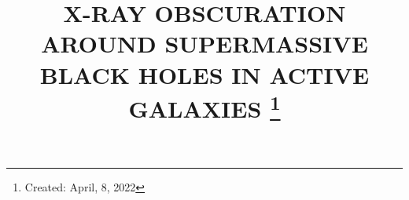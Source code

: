 \documentclass[12pt,linenumbers]{aastex631}
\begin{document}
\title{X-RAY OBSCURATION AROUND SUPERMASSIVE BLACK HOLES IN ACTIVE GALAXIES
\footnote{Created: April, 8, 2022}}


\end{document}
